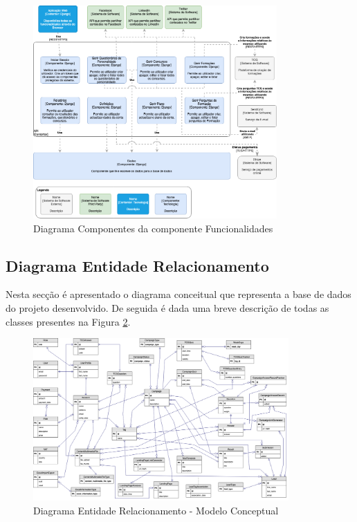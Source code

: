 \begin{figure}[ht!]
	\begin{center}
		\includegraphics[width=0.83\textwidth]{img/arq/diagrama-componentes1}
		\caption{Diagrama Componentes da componente Funcionalidades}
		\label{fig:arq-componentes1}
	\end{center}
\end{figure}

\newpage


\subsection{Diagrama Entidade Relacionamento}

Nesta secção é apresentado o diagrama conceitual que representa a base de dados do projeto desenvolvido. De seguida é dada uma breve descrição de todas as classes presentes na Figura \ref{fig:arq-er}. 

\begin{figure}[ht!]
	\begin{center}
		\includegraphics[width=0.87\textwidth]{img/arq/er}
		\caption{Diagrama Entidade Relacionamento - Modelo Conceptual}
		\label{fig:arq-er}
	\end{center}
\end{figure}

